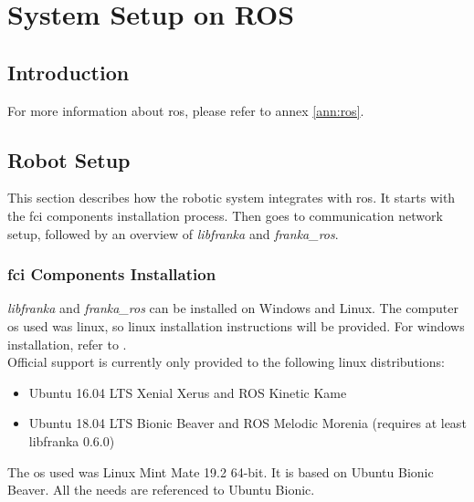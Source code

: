 \chapter{System Setup on ROS}
\label{app:ros_setup}

\section{Introduction}
\label{sec:ros_setup_introduction}

For more information about \gls{ros}, please refer to annex \ref{ann:ros}.

\section{Robot Setup}
\label{sec:ros_setup_robot}

This section describes how the robotic system integrates with \gls{ros}. It starts with the \gls{fci} components installation process. Then goes to communication network setup, followed by an overview of \textit{libfranka} and \textit{franka\_ros}.

\subsection{\gls{fci} Components Installation}
\label{subsec:ros_setup_robotic_system_integration_ros_installation}

 \textit{libfranka} and \textit{franka\_ros} can be installed on Windows and Linux. The computer \gls{os} used was linux, so linux installation instructions will be provided. For windows installation, refer to \cite{FrankaEmikaGmbH_fci_documentation}.\\

Official support is currently only provided to the following linux distributions:

\begin{itemize}
    \item Ubuntu 16.04 LTS Xenial Xerus and ROS Kinetic Kame
    \item Ubuntu 18.04 LTS Bionic Beaver and ROS Melodic Morenia (requires at least libfranka 0.6.0)
\end{itemize}

The \gls{os} used was Linux Mint Mate 19.2 64-bit. It is based on Ubuntu Bionic Beaver. All the needs are referenced to Ubuntu Bionic.

